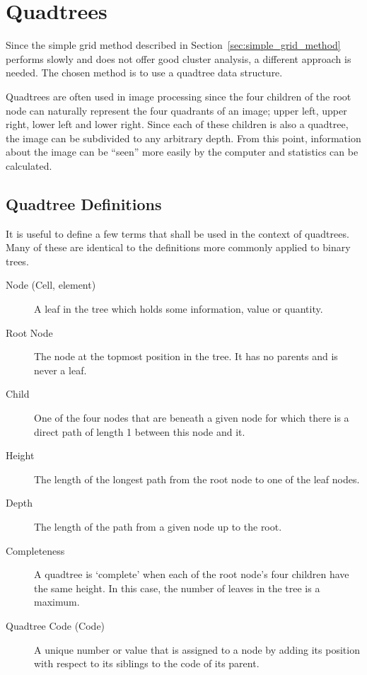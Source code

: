 
\section{Quadtrees}
\label{sec:quadtrees}

Since the simple grid method described in Section~\ref{sec:simple_grid_method}
performs slowly and does not offer good cluster analysis, a different approach
is needed. The chosen method is to use a quadtree data structure.

Quadtrees are often used in image processing since the four children of the
root node can naturally represent the four quadrants of an image; upper left,
upper right, lower left and lower right. Since each of these children is also a
quadtree, the image can be subdivided to any arbitrary depth. From this point,
information about the image can be ``seen'' more easily by the computer and
statistics can be calculated.

\subsection{Quadtree Definitions}
\label{sub:quadtree_definitions}

It is useful to define a few terms that shall be used in the context of
quadtrees. Many of these are identical to the definitions more commonly applied
to binary trees.

\begin{description}
	\item[Node (Cell, element)] A leaf in the tree which holds some
		information, value or quantity.
	\item[Root Node] The node at the topmost position in the tree. It has no
		parents and is never a leaf.
	\item[Child] One of the four nodes that are beneath a given node for which
		there is a direct path of length 1 between this node and it.
	\item[Height] The length of the longest path from the root node to one of
		the leaf nodes.
	\item[Depth] The length of the path from a given node up to the root.
	\item[Completeness] A quadtree is `complete' when each of the root node's
		four children have the same height. In this case, the number of leaves
		in the tree is a maximum.
	\item[Quadtree Code (Code)] A unique number or value that is assigned to a
		node by adding its position with respect to its siblings to the code of
		its parent.
\end{description}

